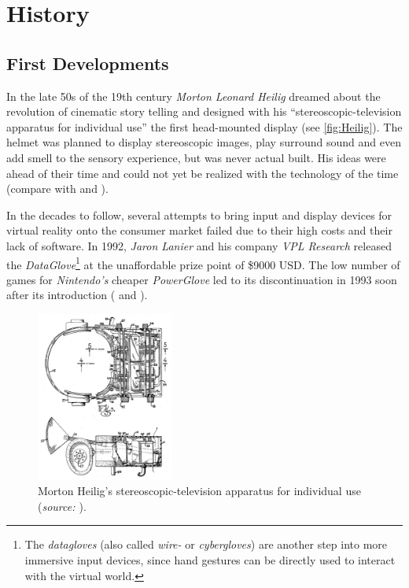 \section{History}\label{sec:history}
\subsection{First Developments}
In the late 50s of the 19th century \textit{Morton Leonard Heilig} dreamed about the revolution of cinematic story telling and designed with his \enquote{stereoscopic-television apparatus for individual use} the first head-mounted display (see \autoref{fig:Heilig}). The helmet was planned to display stereoscopic images, play surround sound and even add smell to the sensory experience, but was never actual built. His ideas were ahead of their time and could not yet be realized with the technology of the time (compare with \cite[p.3]{Toennis.2010} and \cite[p.4 et seq.]{Burdea.2003}). 

In the decades to follow, several attempts to bring input and display devices for virtual reality onto the consumer market failed due to their high costs and their lack of software. In 1992, \textit{Jaron Lanier} and his company \textit{VPL Research} released the \textit{DataGlove}\footnote{The \textit{datagloves} (also called \textit{wire-} or \textit{cybergloves}) are another step into more immersive input devices, since hand gestures can be directly used to interact with the virtual world.} at the unaffordable prize point of \$9000 USD. The low number of games for \textit{Nintendo's} cheaper \textit{PowerGlove} led to its discontinuation in 1993 soon after its introduction (\cite[p.8 et seq.]{Burdea.2003} and \cite[p.19 et seq.]{Doerner.2013}).

\begin{figure}[htbp]
		\centering
		\includegraphics[width=0.4\textwidth]{figures/Heilig_HMD}
		\caption[Stereoscopic-television apparatus for individual use]{Morton Heilig's stereoscopic-television apparatus for individual use (\textit{source: \cite{Heilig.1957}}).}
		\label{fig:Heilig}
\end{figure}

